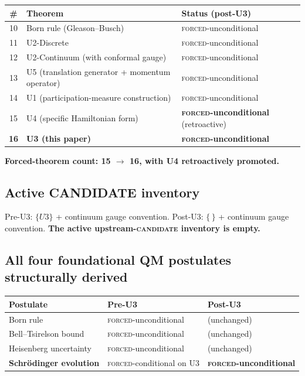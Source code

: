 \documentclass[11pt,a4paper]{article}
\begin{document}
\begin{center}
\begin{tabular}{cll}
\hline
\# & Theorem & Status (post-U3) \\
\hline
10 & Born rule (Gleason--Busch) & \textsc{forced}-unconditional \\
11 & U2-Discrete & \textsc{forced}-unconditional \\
12 & U2-Continuum (with conformal gauge) & \textsc{forced}-unconditional \\
13 & U5 (translation generator + momentum operator) & \textsc{forced}-unconditional \\
14 & U1 (participation-measure construction) & \textsc{forced}-unconditional \\
15 & U4 (specific Hamiltonian form) & \textbf{\textsc{forced}-unconditional} (retroactive) \\
\textbf{16} & \textbf{U3 (this paper)} & \textbf{\textsc{forced}-unconditional} \\
\hline
\end{tabular}
\end{center}

\textbf{Forced-theorem count: 15 $\to$ 16, with U4 retroactively promoted.}

\subsection{Active CANDIDATE inventory}

Pre-U3: $\{U3\}$ + continuum gauge convention. Post-U3: $\{ \, \}$ + continuum gauge convention. \textbf{The active upstream-\textsc{candidate} inventory is empty.}

\subsection{All four foundational QM postulates structurally derived}

\begin{center}
\begin{tabular}{lll}
\hline
Postulate & Pre-U3 & Post-U3 \\
\hline
Born rule & \textsc{forced}-unconditional & (unchanged) \\
Bell--Tsirelson bound & \textsc{forced}-unconditional & (unchanged) \\
Heisenberg uncertainty & \textsc{forced}-unconditional & (unchanged) \\
\textbf{Schr\"odinger evolution} & \textsc{forced}-conditional on U3 & \textbf{\textsc{forced}-unconditional} \\
\hline
\end{tabular}
\end{center}
\end{document}
